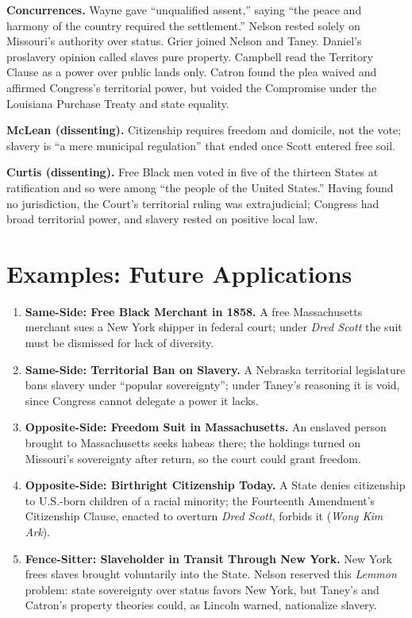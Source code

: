 \documentclass[12pt]{article}
\begin{document}
\textbf{Concurrences.} Wayne gave ``unqualified assent,'' saying ``the peace and harmony of the country required the settlement.'' Nelson rested solely on Missouri's authority over status. Grier joined Nelson and Taney. Daniel's proslavery opinion called slaves pure property. Campbell read the Territory Clause as a power over public lands only. Catron found the plea waived and affirmed Congress's territorial power, but voided the Compromise under the Louisiana Purchase Treaty and state equality.

\textbf{McLean (dissenting).} Citizenship requires freedom and domicile, not the vote; slavery is ``a mere municipal regulation'' that ended once Scott entered free soil.

\textbf{Curtis (dissenting).} Free Black men voted in five of the thirteen States at ratification and so were among ``the people of the United States.'' Having found no jurisdiction, the Court's territorial ruling was extrajudicial; Congress had broad territorial power, and slavery rested on positive local law.

\section{Examples: Future Applications}

\begin{enumerate}
\item \textbf{Same-Side: Free Black Merchant in 1858.} A free Massachusetts merchant sues a New York shipper in federal court; under \textit{Dred Scott} the suit must be dismissed for lack of diversity.
\item \textbf{Same-Side: Territorial Ban on Slavery.} A Nebraska territorial legislature bans slavery under ``popular sovereignty''; under Taney's reasoning it is void, since Congress cannot delegate a power it lacks.
\item \textbf{Opposite-Side: Freedom Suit in Massachusetts.} An enslaved person brought to Massachusetts seeks habeas there; the holdings turned on Missouri's sovereignty after return, so the court could grant freedom.
\item \textbf{Opposite-Side: Birthright Citizenship Today.} A State denies citizenship to U.S.-born children of a racial minority; the Fourteenth Amendment's Citizenship Clause, enacted to overturn \textit{Dred Scott}, forbids it (\textit{Wong Kim Ark}).
\item \textbf{Fence-Sitter: Slaveholder in Transit Through New York.} New York frees slaves brought voluntarily into the State. Nelson reserved this \textit{Lemmon} problem: state sovereignty over status favors New York, but Taney's and Catron's property theories could, as Lincoln warned, nationalize slavery.
\end{enumerate}
\end{document}
